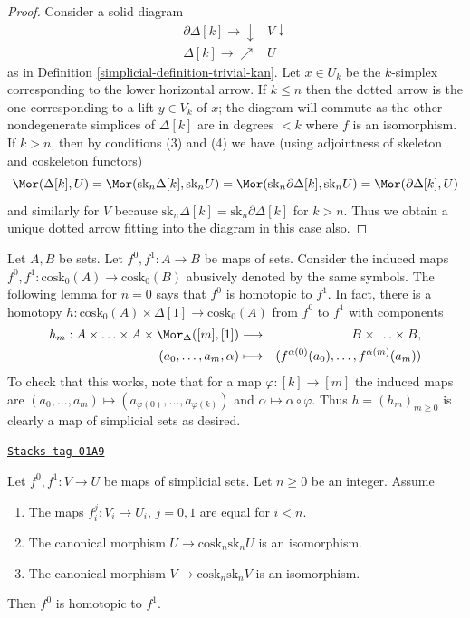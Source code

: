 \begin{proof}

Consider a solid diagram
$$
\begin{array}{cc}\partial \Delta[k] \longrightarrow\downarrow & V \downarrow \\ \Delta[k] \longrightarrow\nearrow & U\end{array}
$$
as in Definition \ref{simplicial-definition-trivial-kan}. Let $x \in U_k$ be
the $k$-simplex corresponding to the lower horizontal arrow.
If $k \leq n$ then the dotted arrow is the one corresponding to
a lift $y \in V_k$ of $x$; the diagram will commute as the other
nondegenerate simplices of $\Delta[k]$ are in degrees $< k$ where
$f$ is an isomorphism. If $k > n$, then by conditions (3) and (4)
we have (using adjointness of skeleton and coskeleton functors)
$$
\Mor(\Delta[k], U) =
\Mor(\text{sk}_n\Delta[k], \text{sk}_nU) =
\Mor(\text{sk}_n\partial\Delta[k], \text{sk}_nU) =
\Mor(\partial \Delta[k], U)
$$
and similarly for $V$ because
$\text{sk}_n\Delta[k] = \text{sk}_n\partial\Delta[k]$ for $k > n$.
Thus we obtain a unique dotted arrow fitting into the diagram in
this case also.
\end{proof}

Let $A, B$ be sets. Let $f^0, f^1 : A \to B$ be maps of sets.
Consider the induced maps $f^0, f^1 : \text{cosk}_0(A) \to \text{cosk}_0(B)$
abusively denoted by the same symbols. The following lemma for $n = 0$
says that $f^0$ is homotopic to $f^1$. In fact, there is a
homotopy $h : \text{cosk}_0(A) \times \Delta[1] \to \text{cosk}_0(A)$
from $f^0$ to $f^1$ with components
\begin{eqnarray*}
h_m : A \times \ldots \times A \times \Mor_{\Delta}([m], [1])
& \longrightarrow &
B \times \ldots \times B, \\
(a_0, \ldots, a_m, \alpha) & \longmapsto &
(f^{\alpha(0)}(a_0), \ldots, f^{\alpha(m)}(a_m))
\end{eqnarray*}
To check that this works, note that for a map $\varphi : [k] \to [m]$
the induced maps are
$(a_0, \ldots, a_m) \mapsto (a_{\varphi(0)}, \ldots, a_{\varphi(k)})$
and $\alpha \mapsto \alpha \circ \varphi$. Thus $h = (h_m)_{m \geq 0}$
is clearly a map of simplicial sets as desired.

\begin{lemma}[Homotopy]
\label{simplicial-lemma-homotopy}
\href{https://stacks.math.columbia.edu/tag/01A9}{\texttt{Stacks tag 01A9}}

Let $f^0, f^1 : V \to U$ be maps of simplicial sets.
Let $n \geq 0$ be an integer.
Assume
\begin{enumerate}
\item The maps $f^j_i : V_i \to U_i$, $j = 0, 1$ are equal for $i < n$.
\item The canonical morphism $U \to \text{cosk}_n \text{sk}_n U$
is an isomorphism.
\item The canonical morphism $V \to \text{cosk}_n \text{sk}_n V$
is an isomorphism.
\end{enumerate}
Then $f^0$ is homotopic to $f^1$.
\end{lemma}

